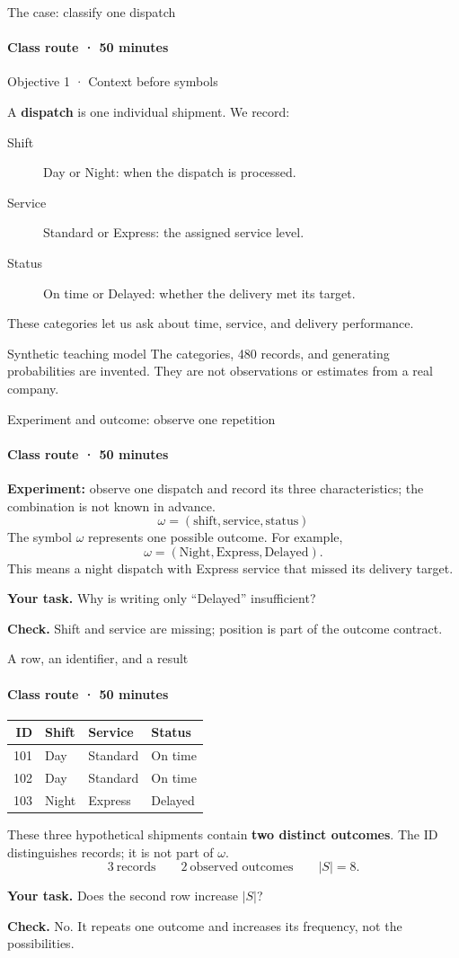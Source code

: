 \documentclass[aspectratio=169,11pt,english]{beamer}
\newcommand{\objetivo}[1]{{\small\color{TecAzul}#1\par}\medskip}
\newcommand{\question}[1]{\par\smallskip\textbf{Your task.} #1\par}
\newcommand{\checkit}[1]{\par\smallskip\textbf{Check.} #1\par}
\begin{document}
\begin{frame}{The case: classify one dispatch}
  \framesubtitle{Class route · 50 minutes}
  \objetivo{Objective 1 · Context before symbols}
  A \textbf{dispatch} is one individual shipment. We record:
  \begin{description}
    \item[Shift] Day or Night: when the dispatch is processed.
    \item[Service] Standard or Express: the assigned service level.
    \item[Status] On time or Delayed: whether the delivery met its target.
  \end{description}
  These categories let us ask about time, service, and delivery performance.
  \begin{alertblock}{Synthetic teaching model}
    The categories, 480 records, and generating probabilities are invented.
    They are not observations or estimates from a real company.
  \end{alertblock}
\end{frame}

\begin{frame}{Experiment and outcome: observe one repetition}
  \framesubtitle{Class route · 50 minutes}
  \textbf{Experiment:} observe one dispatch and record its three characteristics;
  the combination is not known in advance.
  \[
    \omega=(\text{shift},\text{service},\text{status})
  \]
  The symbol $\omega$ represents one possible outcome. For example,
  \[
    \omega=(\text{Night},\text{Express},\text{Delayed}).
  \]
  This means a night dispatch with Express service that missed its delivery target.
  \question{Why is writing only ``Delayed'' insufficient?}
  \checkit{Shift and service are missing; position is part of the outcome contract.}
\end{frame}

\begin{frame}{A row, an identifier, and a result}
  \framesubtitle{Class route · 50 minutes}
  \begin{tabular}{rlll}
    \toprule ID & Shift & Service & Status \\ \midrule
    101 & Day & Standard & On time\\
    102 & Day & Standard & On time\\
    103 & Night & Express & Delayed\\ \bottomrule
  \end{tabular}
  \par\medskip
  These three hypothetical shipments contain \textbf{two distinct outcomes}.
  The ID distinguishes records; it is not part of $\omega$.
  \[
    3\ \text{records}\qquad 2\ \text{observed outcomes}\qquad |S|=8.
  \]
  \question{Does the second row increase $|S|$?}
  \checkit{No. It repeats one outcome and increases its frequency, not the possibilities.}
\end{frame}
\end{document}
